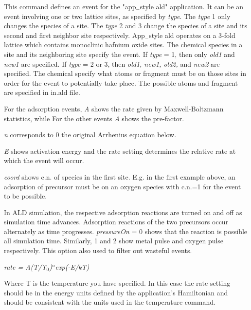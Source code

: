 \documentclass[a4paper,12pt]{report}
\begin{document}
This command defines an event for the "app$_-$style ald" application. 
It can be an event involving one or two lattice sites, as specified by \emph{type}. 
The \emph{type} 1 only changes the species of a site. 
The \emph{type} 2 and 3 change the species of a site and its second and first neighbor site respectively. 
App$_-$style ald operates on a 3-fold lattice which contains monoclinic hafnium oxide sites.
The chemical species in a site and its neighboring site specify the event. 
If \emph{type} = 1, then only \emph{old1} and \emph{new1} are specified. 
If \emph{type} = 2 or 3, then \emph{old1, new1, old2,} and \emph{new2} are specified.
The chemical specify what atoms or fragment must be on those sites in order for the event to potentially take place. 
The possible atoms and fragment are specified in in.ald file. 
\newline

For the adsorption events, \emph{A} shows the rate given by Maxwell-Boltzmann statistics,
while For the other events \emph{A} shows the pre-factor.
\newline

\emph{n} corresponds to 0 the original Arrhenius equation below.
\newline

\emph{E} shows activation energy and the rate setting determines the relative rate at which the event will occur. 
\newline

\emph{coord} shows c.n. of species in the first site.
E.g. in the first example above, an adsorption of precursor must be on an oxygen species with c.n.=1 for the event to be possible.
\newline

In ALD simulation, the respective adsorption reactions are turned on and off as simulation time advances. 
Adsorption reactions of the two precursors occur alternately as time progresses. 
\emph{pressureOn} = 0 shows that the reaction is possible all simulation time.
Similarly, 1 and 2 show metal pulse and oxygen pulse respectively.
This option also used to filter out wasteful events.
\newline

\emph{rate = A(T/T$_0$)$^n$exp(-E/kT)}
\newline

Where T is the temperature you have specified.
In this case the rate setting should be in the energy units defined by the application's Hamiltonian and should be
consistent with the units used in the temperature command.
\newline
\end{document}
